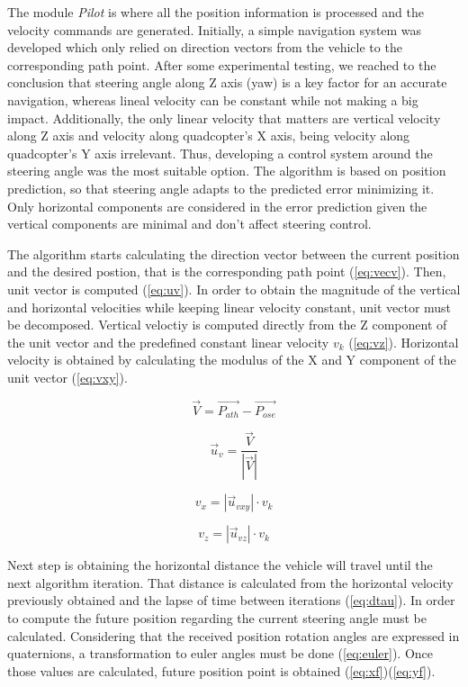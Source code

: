 \documentclass{styles/svproc}
\begin{document}
	The module \textit{Pilot} is where all the position information is processed and the velocity commands are generated. Initially, a simple navigation system was developed which only relied on direction vectors from the vehicle to the corresponding path point. After some experimental testing, we reached to the conclusion that steering angle along Z axis (yaw) is a key factor for an accurate navigation, whereas lineal velocity can be constant while not making a big impact. Additionally, the only linear velocity that matters are vertical velocity along Z axis and velocity along quadcopter's X axis, being velocity along quadcopter's Y axis irrelevant. Thus, developing a control system around the steering angle was the most suitable option. The algorithm is based on position prediction, so that steering angle adapts to the predicted error minimizing it. Only horizontal components are considered in the error prediction given the vertical components are minimal and don't affect steering control.
	
	The algorithm starts calculating the direction vector between the current position and the desired postion, that is the corresponding path point (\ref{eq:vecv}). Then, unit vector is computed (\ref{eq:uv}). In order to obtain the magnitude of the vertical and horizontal velocities while keeping linear velocity constant, unit vector must be decomposed. Vertical veloctiy is computed directly from the Z component of the unit vector and the predefined constant linear velocity $v_{k}$ (\ref{eq:vz}). Horizontal velocity is obtained by calculating the modulus of the X and Y component of the unit vector (\ref{eq:vxy}).

	\begin{equation}
	\vec{V} = \vec{P_{ath}} - \vec{P_{ose}}
	\label{eq:vecv}
	\end{equation}
	
	\begin{equation}
	\vec{u}_{v} = \frac{\vec{V}}{|\vec{V}|}
	\label{eq:uv}
	\end{equation}
	
	\begin{equation}
	v_{x} = |\vec{u}_{vxy}| \cdot v_{k}
	\label{eq:vxy}
	\end{equation}
	
	\begin{equation}
	v_{z} = |\vec{u}_{vz}| \cdot v_{k}
	\label{eq:vz}
	\end{equation}
	
	Next step is obtaining the horizontal distance the vehicle will travel until the next algorithm iteration. That distance is calculated from the horizontal velocity previously obtained and the lapse of time between iterations (\ref{eq:dtau}). In order to compute the future position regarding the current steering angle must be calculated. Considering that the received position rotation angles are expressed in quaternions, a transformation to euler angles must be done (\ref{eq:euler}). Once those values are calculated, future position point is obtained (\ref{eq:xf})(\ref{eq:yf}).
	
\end{document}
